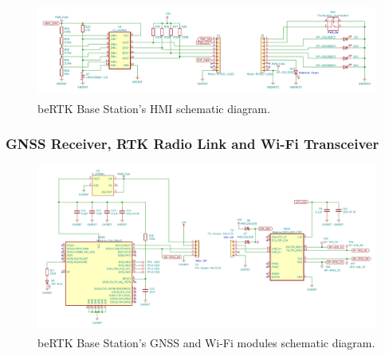 \begin{figure}[h]
	\centering
	\includegraphics[width=1.0\textwidth]{Chapters/Figures/chapter3/Back_Panel.pdf}
	\caption{beRTK\textsuperscript{\textregistered} Base Station's HMI schematic diagram.}
	\label{fig:HMI_circuit}
\end{figure}




\subsubsection{GNSS Receiver, RTK Radio Link and Wi-Fi Transceiver}\label{sec:3232_ZEDF9P_XBEE3}

\begin{figure}[h]
	\centering
	\includegraphics[width=1.0\textwidth]{Chapters/Figures/chapter3/Modules_ZEDF9P_XBEE3.pdf}
	\caption{beRTK\textsuperscript{\textregistered} Base Station's GNSS and Wi-Fi modules schematic diagram.}
	\label{fig:ZEDF9P_XBEE3_circuit}
\end{figure}


